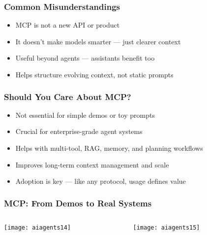 \begin{frame}[fragile]\frametitle{Common Misunderstandings}
      \begin{itemize}
        \item MCP is not a new API or product
        \item It doesn’t make models smarter — just clearer context
        \item Useful beyond agents — assistants benefit too
        \item Helps structure evolving context, not static prompts
      \end{itemize}
\end{frame}

\begin{frame}[fragile]\frametitle{Should You Care About MCP?}
      \begin{itemize}
        \item Not essential for simple demos or toy prompts
        \item Crucial for enterprise-grade agent systems
        \item Helps with multi-tool, RAG, memory, and planning workflows
        \item Improves long-term context management and scale
        \item Adoption is key — like any protocol, usage defines value
      \end{itemize}
\end{frame}




\begin{frame}[fragile]\frametitle{MCP: From Demos to Real Systems}

\begin{columns}
    \begin{column}[T]{0.5\linewidth}
		\begin{center}
		\texttt{[image: aiagents14]}
		\end{center}

    \end{column}
    \begin{column}[T]{0.5\linewidth}
		\begin{center}
		\texttt{[image: aiagents15]}
		\end{center}
    \end{column}
  \end{columns}
  


\end{frame}

